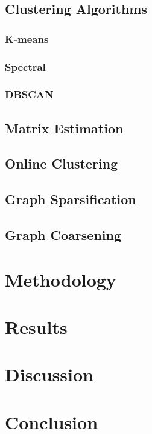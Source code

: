 \documentclass[journal]{IEEEtran}
\begin{document}
\subsection{Clustering Algorithms}
\subsubsection{K-means}
\subsubsection{Spectral}
\subsubsection{DBSCAN}

\subsection{Matrix Estimation}
\subsection{Online Clustering}
\subsection{Graph Sparsification}
\subsection{Graph Coarsening}

\section{Methodology}\label{methodology}

\section{Results}\label{results}

\section{Discussion}\label{discussion}

\section{Conclusion}\label{conclusion}
\end{document}
